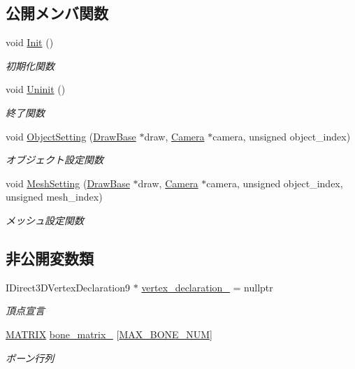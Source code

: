 \subsection*{公開メンバ関数}
\begin{DoxyCompactItemize}
\item 
void \mbox{\hyperlink{class_vertex_shader_animated_default_a974cb247b42cb1c9288a9de9ed9048e9}{Init}} ()
\begin{DoxyCompactList}\small\item\em 初期化関数 \end{DoxyCompactList}\item 
void \mbox{\hyperlink{class_vertex_shader_animated_default_a683f221e9b70d13fdb63e7b8fb15f31c}{Uninit}} ()
\begin{DoxyCompactList}\small\item\em 終了関数 \end{DoxyCompactList}\item 
void \mbox{\hyperlink{class_vertex_shader_animated_default_a43d82c0666bffa49704eda4eb1f549d3}{Object\+Setting}} (\mbox{\hyperlink{class_draw_base}{Draw\+Base}} $\ast$draw, \mbox{\hyperlink{class_camera}{Camera}} $\ast$camera, unsigned object\+\_\+index)
\begin{DoxyCompactList}\small\item\em オブジェクト設定関数 \end{DoxyCompactList}\item 
void \mbox{\hyperlink{class_vertex_shader_animated_default_ad19fa307106654c4e8337db832018cc6}{Mesh\+Setting}} (\mbox{\hyperlink{class_draw_base}{Draw\+Base}} $\ast$draw, \mbox{\hyperlink{class_camera}{Camera}} $\ast$camera, unsigned object\+\_\+index, unsigned mesh\+\_\+index)
\begin{DoxyCompactList}\small\item\em メッシュ設定関数 \end{DoxyCompactList}\end{DoxyCompactItemize}
\subsection*{非公開変数類}
\begin{DoxyCompactItemize}
\item 
I\+Direct3\+D\+Vertex\+Declaration9 $\ast$ \mbox{\hyperlink{class_vertex_shader_animated_default_af09cbf7cd74f29c79d96333b7fe922db}{vertex\+\_\+declaration\+\_\+}} = nullptr
\begin{DoxyCompactList}\small\item\em 頂点宣言 \end{DoxyCompactList}\item 
\mbox{\hyperlink{_matrix_8h_a032295cd9fb1b711757c90667278e744}{M\+A\+T\+R\+IX}} \mbox{\hyperlink{class_vertex_shader_animated_default_a5e353de337ad6ad59b3632cd3bff8605}{bone\+\_\+matrix\+\_\+}} \mbox{[}\mbox{\hyperlink{class_vertex_shader_animated_default_aa703d290c4ce5aa16f8d030fc58bceea}{M\+A\+X\+\_\+\+B\+O\+N\+E\+\_\+\+N\+UM}}\mbox{]}
\begin{DoxyCompactList}\small\item\em ボーン行列 \end{DoxyCompactList}\end{DoxyCompactItemize}
